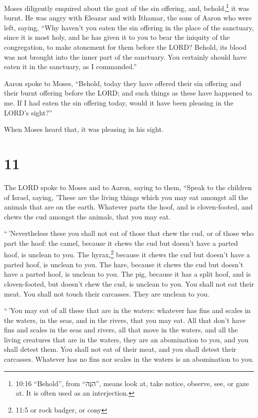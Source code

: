  Moses diligently enquired about the goat of the sin
offering, and, behold,\footnote{10:16 ``Behold'', from ``הִנֵּה'', means
  look at, take notice, observe, see, or gaze at. It is often used as an
  interjection.} it was burnt. He was angry with Eleazar and with
Ithamar, the sons of Aaron who were left, saying,  ``Why
haven't you eaten the sin offering in the place of the sanctuary, since
it is most holy, and he has given it to you to bear the iniquity of the
congregation, to make atonement for them before the LORD? 
Behold, its blood was not brought into the inner part of the sanctuary.
You certainly should have eaten it in the sanctuary, as I commanded.''

 Aaron spoke to Moses, ``Behold, today they have offered
their sin offering and their burnt offering before the LORD; and such
things as these have happened to me. If I had eaten the sin offering
today, would it have been pleasing in the LORD's sight?''

 When Moses heard that, it was pleasing in his sight.

\hypertarget{section-10}{%
\section{11}\label{section-10}}

 The LORD spoke to Moses and to Aaron, saying to them,
 ``Speak to the children of Israel, saying, 'These are the
living things which you may eat amongst all the animals that are on the
earth.  Whatever parts the hoof, and is cloven-footed, and
chews the cud amongst the animals, that you may eat.

 ``\,'Nevertheless these you shall not eat of those that
chew the cud, or of those who part the hoof: the camel, because it chews
the cud but doesn't have a parted hoof, is unclean to you. 
The hyrax,\footnote{11:5 or rock badger, or cony} because it chews the
cud but doesn't have a parted hoof, is unclean to you.  The
hare, because it chews the cud but doesn't have a parted hoof, is
unclean to you.  The pig, because it has a split hoof, and
is cloven-footed, but doesn't chew the cud, is unclean to you.
 You shall not eat their meat. You shall not touch their
carcasses. They are unclean to you.

 ``\,'You may eat of all these that are in the waters:
whatever has fins and scales in the waters, in the seas, and in the
rivers, that you may eat.  All that don't have fins and
scales in the seas and rivers, all that move in the waters, and all the
living creatures that are in the waters, they are an abomination to you,
 and you shall detest them. You shall not eat of their
meat, and you shall detest their carcasses.  Whatever has
no fins nor scales in the waters is an abomination to you.

